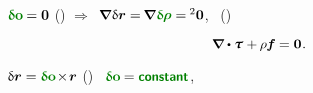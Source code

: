 \vspace{-0.2em}
${\constvarvector{o} \hspace{-0.1ex} = \zerovector}$
()
${\Rightarrow}$~${\hspace{-0.1ex} \boldnabla \hspace{.1ex} \variation{\currentlocationvector}
= \hspace{-0.2ex} \boldnabla \hspace{.1ex} \constvarvector{\hspace{-0.1ex}\bm{\rho}}
= \hspace{-0.12ex} \zerobivalent}$,
~()

\nopagebreak\vspace{-0.2em}
\begin{equation}\label{thebalanceofmomentum.nonlinear.withoutmultipliers}
\boldnabla \dotp \cauchystress \hspace{.1ex} + \hspace{-0.1ex} \massdensity \hspace{-0.1ex} \massloadvector \hspace{-0.1ex} = \zerovector
\hspace{.1ex} .
\end{equation}

\vspace{-0.1em}
${\variation{\currentlocationvector} = \constvarvector{o} \hspace{-0.33ex} \times \hspace{-0.33ex} \currentlocationvector}$
()
~${\constvarvector{o} \hspace{-0.1ex} = \boldconstant}$,


